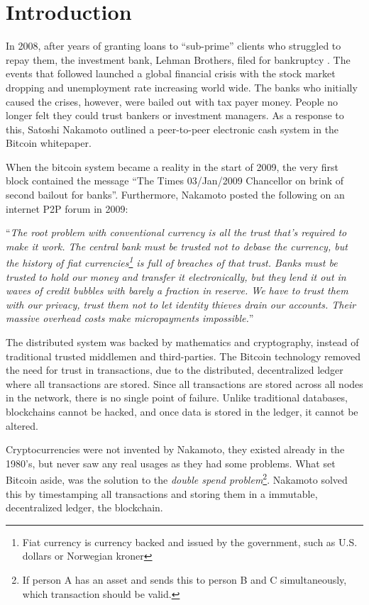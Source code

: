 \chapter{Introduction}
In 2008, after years of granting loans to \enquote{sub-prime} clients who struggled to repay them, the investment bank, Lehman Brothers, filed for bankruptcy \cite{lehman}. The events that followed launched a global financial crisis with the stock market dropping and unemployment rate increasing world wide. The banks who initially caused the crises, however, were bailed out with tax payer money. People no longer felt they could trust bankers or investment managers. As a response to this, Satoshi Nakamoto outlined a peer-to-peer electronic cash system in the Bitcoin whitepaper. 

When the bitcoin system became a reality in the start of 2009, the very first block contained the message \enquote{The Times 03/Jan/2009 Chancellor on brink of second bailout for banks}. Furthermore, Nakamoto posted the following on an internet P2P forum \cite{nakamoto_trust} in 2009: 

\enquote{\textit{The root problem with conventional currency is all the trust that's required to make it work. The central bank must be trusted not to debase the currency, but the history of fiat currencies\footnote{Fiat currency is currency backed and issued by the government, such as U.S. dollars or Norwegian kroner} is full of breaches of that trust. Banks must be trusted to hold our money and transfer it electronically, but they lend it out in waves of credit bubbles with barely a fraction in reserve. We have to trust them with our privacy, trust them not to let identity thieves drain our accounts. Their massive overhead costs make micropayments impossible.}}

The distributed system was backed by mathematics and cryptography, instead of traditional trusted middlemen and third-parties. The Bitcoin technology removed the need for trust in transactions, due to the distributed, decentralized ledger where all transactions are stored. Since all transactions are stored across all nodes in the network, there is no single point of failure. Unlike traditional databases, blockchains cannot be hacked, and once data is stored in the ledger, it cannot be altered.

Cryptocurrencies were not invented by Nakamoto, they existed already in the 1980's, but never saw any real usages as they had some problems. What set Bitcoin aside, was the solution to the \textit{double spend problem}\footnote{If person A has an asset and sends this to person B and C simultaneously, which transaction should be valid.}. Nakamoto solved this by timestamping all transactions and storing them in a immutable, decentralized ledger, the blockchain.

